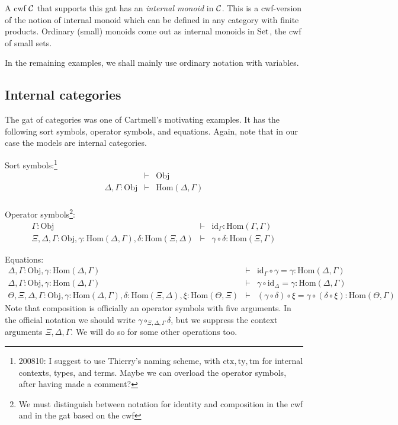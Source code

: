 \documentclass{lmcs}
\def\Obj{\mathrm{Obj}}
\def\Ctx{\mathrm{Ctx}}
\def\Hom{\mathrm{Hom}}
\def\id{\mathrm{id}}
\newcommand{\ctx}{\mathrm{ctx}}
\newcommand{\ty}{\mathrm{ty}}
\newcommand{\tm}{\mathrm{tm}}
\begin{document}
A cwf ${\mathcal C}$ that supports this gat has an {\em internal monoid} in ${\mathcal C}$. This is a cwf-version of the notion of internal monoid which can be defined in any category with finite products. Ordinary (small) monoids come out as internal monoids in ${\rm Set}$, the cwf of small sets.

In the remaining examples, we shall mainly use ordinary notation with variables.

\subsection{Internal categories} The gat of categories was one of Cartmell's motivating examples. It has the following sort symbols, operator symbols, and equations. Again, note that in our case the models are internal categories.

Sort symbols:\footnote{200810: I suggest to use Thierry's naming scheme, with $\ctx, \ty, \tm$ for internal contexts, types, and terms. Maybe we can overload the operator symbols, after having made a comment?}
\begin{eqnarray*}
&\vdash& \Obj\\
\Delta, \Gamma : \Obj &\vdash& \Hom(\Delta,\Gamma)\\
\end{eqnarray*}

Operator symbols\footnote{We must distinguish between notation for identity and composition in the cwf and in the gat based on the cwf}:
\begin{eqnarray*}
\Gamma : \Obj &\vdash& \id_\Gamma : \Hom(\Gamma,\Gamma)\\
\Xi,\Delta,\Gamma : \Obj, \gamma : \Hom(\Delta,\Gamma), \delta : \Hom(\Xi,\Delta) &\vdash&
\gamma \circ \delta : \Hom(\Xi,\Gamma)
\end{eqnarray*}

Equations:
\begin{eqnarray*}
\Delta, \Gamma : \Obj, \gamma : \Hom(\Delta,\Gamma) &\vdash& \id_\Gamma \circ \gamma = \gamma : \Hom(\Delta,\Gamma)\\
\Delta, \Gamma : \Obj, \gamma : \Hom(\Delta,\Gamma) &\vdash& \gamma \circ \id_\Delta = \gamma : \Hom(\Delta,\Gamma)\\
\Theta, \Xi,\Delta,\Gamma : \Obj, \gamma : \Hom(\Delta,\Gamma), \delta : \Hom(\Xi,\Delta), \xi : \Hom(\Theta,\Xi) &\vdash&
(\gamma \circ \delta) \circ \xi = \gamma \circ (\delta \circ \xi): \Hom(\Theta,\Gamma)
\end{eqnarray*}
Note that composition is officially an operator symbols with five arguments. In the official notation we should write $\gamma \circ_{\Xi,\Delta,\Gamma} \delta$, but we suppress the context arguments $\Xi,\Delta,\Gamma$. We will do so for some other operations too.
\end{document}
